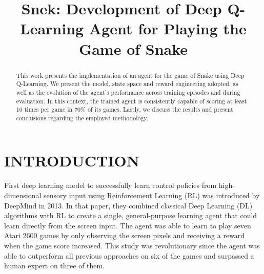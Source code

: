 \documentclass[conference]{IEEEtran}
\begin{document}
\title{Snek: Development of Deep Q-Learning Agent for Playing the Game of Snake}
\author{
\and
{}
\and
{}
}

\maketitle


\begin{abstract}


This work presents the implementation of an agent for the game of Snake using Deep Q-Learning. We present the model, state space and reward engineering adopted, as well as the evolution of the agent's performance across training episodes and during evaluation. In this context, the trained agent is consistently capable of scoring at least 10 times per game in 70\% of its games. Lastly, we discuss the results and present conclusions regarding the employed methodology.

\end{abstract}


\section{INTRODUCTION}

First deep learning model to successfully learn control policies from high-dimensional sensory input using Reinforcement Learning (RL) was introduced by DeepMind in 2013. In that paper, they combined classical Deep Learning (DL) algorithms with RL to create a single, general-purpose learning agent that could learn directly from the screen input. The agent was able to learn to play seven Atari 2600 games by only observing the screen pixels and receiving a reward when the game score increased. This study was revolutionary since the agent was able to outperform all previous approaches on six of the games and surpassed a human expert on three of them.
\end{document}
